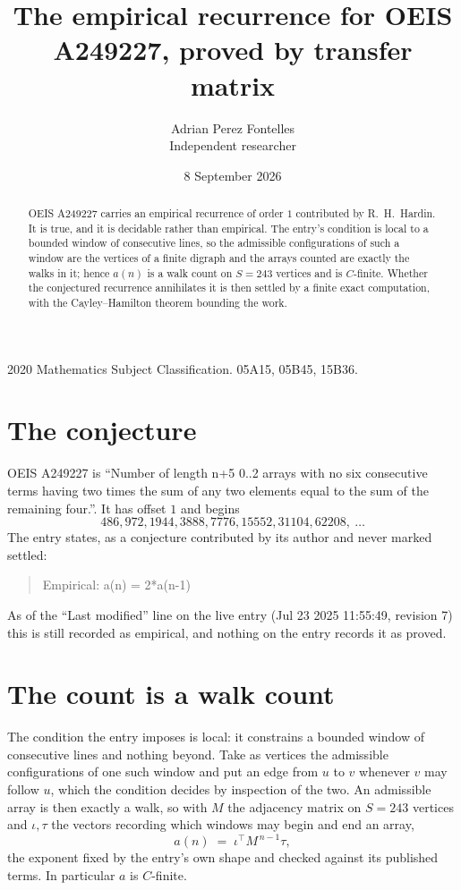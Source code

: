 \documentclass[11pt,a4paper]{article}
\title{The empirical recurrence for OEIS A249227, proved by transfer matrix}
\author{Adrian Perez Fontelles\\ \small Independent researcher}
\date{8 September 2026}
\theoremstyle{plain}
\theoremstyle{definition}
\begin{document}
\maketitle

\begin{abstract}
OEIS A249227 carries an empirical recurrence of order $1$ contributed by R.~H.~Hardin. It is
true, and it is decidable rather than empirical. The entry's condition is local to a bounded window of consecutive lines, so
the admissible configurations of such a window are the vertices of a finite digraph and the
arrays counted are exactly the walks in it; hence $a(n)$ is a walk count on $S=243$ vertices
and is $C$-finite. Whether the conjectured recurrence annihilates it is then settled by a
finite exact computation, with the Cayley--Hamilton theorem bounding the work.
\end{abstract}

\noindent\small 2020 Mathematics Subject Classification. 05A15, 05B45, 15B36.\normalsize

\section{The conjecture}

OEIS A249227 is ``Number of length n+5 0..2 arrays with no six consecutive terms having two times the sum of any two elements equal to the sum of the remaining four.''. It has offset $1$ and begins
\[
486, 972, 1944, 3888, 7776, 15552, 31104, 62208,\ \dots
\]
The entry states, as a conjecture contributed by its author and never marked settled:
\begin{quote}
Empirical: a(n) = 2*a(n-1)
\end{quote}
As of the ``Last modified'' line on the live entry (Jul 23 2025 11:55:49, revision 7) this is still
recorded as empirical, and nothing on the entry records it as proved.

\section{The count is a walk count}

The condition the entry imposes is local: it constrains a bounded window of consecutive lines and nothing beyond. Take as
vertices the admissible configurations of one such window and put an edge from $u$ to $v$
whenever $v$ may follow $u$, which the condition decides by inspection of the two. An
admissible array is then exactly a walk, so with $M$ the adjacency matrix on $S=243$ vertices
and $\iota,\tau$ the vectors recording which windows may begin and end an array,
\[
a(n)\;=\;\iota^{\!\top}M^{\,n-1}\tau ,
\]
the exponent fixed by the entry's own shape and checked against its published terms. In
particular $a$ is $C$-finite.
\end{document}
